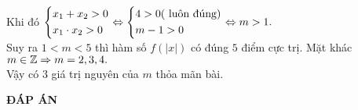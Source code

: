 \begin{ex}
{Khi đó $ \left\{\begin{aligned}&x_1+x_2>0\\&x_1\cdot x_2>0\end{aligned}\right.\Leftrightarrow \left\{\begin{aligned}&4>0 (\text{ luôn đúng})\\&m-1>0\end{aligned}\right.\Leftrightarrow m>1. $\\
Suy ra $ 1<m<5 $ thì hàm số $ f(|x|) $ có đúng $ 5 $ điểm cực trị. Mặt khác $ m\in \Bbb{Z}\Rightarrow m=2,3,4. $\\
Vậy có $ 3 $ giá trị nguyên của $ m $ thỏa mãn bài.
\begin{center}
\end{center}

}
\end{ex}
\newpage
\begin{center}
	\textbf{ĐÁP ÁN}
\end{center}
\begin{multicols}{10}
	 
\end{multicols}

